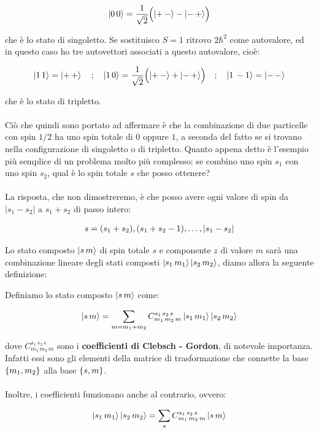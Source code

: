 \begin{align*}
	\ket{0 \, 0} = \frac{1}{\sqrt{2}} \qty\Big( \ket{+ \, -} - \ket{- \, +} )
\end{align*}

	che è lo stato di singoletto. Se sostituisco $S = 1$ ritrovo $2\hbar^2$ come autovalore, ed in questo caso ho tre autovettori associati a questo autovalore, cioè:
	
\begin{align*}
	\ket{1 \, 1} = \ket{+ \, +} \quad ; \quad \ket{1 \, 0} = \frac{1}{\sqrt{2}} \qty\Big(\ket{+ \, -} + \ket{- \, +}) \quad ; \quad \ket{1 \, - 1} = \ket{- \, -}
\end{align*}
 
 	che è lo stato di tripletto.
	\\
	\\
	Ciò che quindi sono portato ad affermare è che la combinazione di due particelle con spin $1/2$ ha uno spin totale di $0$ oppure $1$, a seconda del fatto se si trovano nella configurazione di singoletto o di tripletto. Quanto appena detto è l'esempio più semplice di un problema molto più complesso: se combino uno spin $s_1$ con uno spin $s_2$, qual è lo spin totale $s$ che posso ottenere?
	\\
	\\
	La risposta, che non dimostreremo, è che posso avere ogni valore di spin da $|s_1 - s_2|$ a $s_1 + s_2$ di passo intero:
	
\begin{align*}
	s = \qty(s_1  + s_2), \qty(s_1 + s_2 - 1), \ldots, |s_1 - s_2 |
\end{align*}

	Lo stato composto $\ket{ s \, m}$ di spin totale $s$ e componente $z$ di valore $m$ sarà una combinazione lineare degli stati composti $\ket{s_1 \, m_1}\ket{s_2 \, m_2}$, diamo allora la seguente definizione:
	
\begin{mydef}
	Definiamo lo stato composto $\ket{ s \, m}$ come:
	
\begin{align*}
	\ket{s \, m} = \sum_{m = m_1 + m_2} C_{m_1 \, m_2 \, m}^{s_1 \, s_2 \, s} \ket{s_1 \, m_1} \ket{s_2 \, m_2}
\end{align*}

	dove $C_{m_1 \, m_2 \, m}^{s_1 \, s_2 \, s} $ sono i \textbf{coefficienti di Clebsch - Gordon}, di notevole importanza. Infatti essi sono gli elementi della matrice di trasformazione che connette la base $\qty{m_1, m_2}$ alla base $\qty{s, m}$.  
	\\
	\\
	Inoltre, i coefficienti funzionano anche al contrario, ovvero:
	
\begin{align*}
	\ket{s_1 \, m_1} \ket{s_2 \, m_2 } = \sum_s C_{m_1 \, m_2 \, m}^{s_1 \, s_2 \, s} \ket{s \, m}
\end{align*}

\end{mydef}

